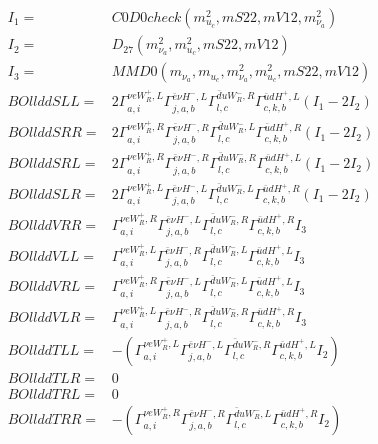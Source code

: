 \documentclass[A4,landscape]{article}
\begin{document}
\begin{align} 
I_1 = & C0D0check(m^2_{u_{{c}}}, mS22, mV12, m^2_{\nu_{{a}}}) \\ 
I_2 = & D_{27}(m^2_{\nu_{{a}}}, m^2_{u_{{c}}}, mS22, mV12) \\ 
I_3 = & MMD0(m_{\nu_{{a}}}, m_{u_{{c}}}, m^2_{\nu_{{a}}}, m^2_{u_{{c}}}, mS22, mV12) \\ 
  BOllddSLL= & 2  \Gamma^{\nu e W_R^+,L}_{a, i} \Gamma^{\bar{e}\nu H^- ,L}_{j, a, b} \Gamma^{\bar{d}u W_R^- ,R}_{l, c} \Gamma^{\bar{u}d H^+,L}_{c, k, b} (I_1 - 2 I_2) \\ 
  BOllddSRR= & 2  \Gamma^{\nu e W_R^+,R}_{a, i} \Gamma^{\bar{e}\nu H^- ,R}_{j, a, b} \Gamma^{\bar{d}u W_R^- ,L}_{l, c} \Gamma^{\bar{u}d H^+,R}_{c, k, b} (I_1 - 2 I_2) \\ 
  BOllddSRL= & 2  \Gamma^{\nu e W_R^+,R}_{a, i} \Gamma^{\bar{e}\nu H^- ,R}_{j, a, b} \Gamma^{\bar{d}u W_R^- ,R}_{l, c} \Gamma^{\bar{u}d H^+,L}_{c, k, b} (I_1 - 2 I_2) \\ 
  BOllddSLR= & 2  \Gamma^{\nu e W_R^+,L}_{a, i} \Gamma^{\bar{e}\nu H^- ,L}_{j, a, b} \Gamma^{\bar{d}u W_R^- ,L}_{l, c} \Gamma^{\bar{u}d H^+,R}_{c, k, b} (I_1 - 2 I_2) \\ 
  BOllddVRR= &  \Gamma^{\nu e W_R^+,R}_{a, i} \Gamma^{\bar{e}\nu H^- ,L}_{j, a, b} \Gamma^{\bar{d}u W_R^- ,R}_{l, c} \Gamma^{\bar{u}d H^+,R}_{c, k, b} I_3 \\ 
  BOllddVLL= &  \Gamma^{\nu e W_R^+,L}_{a, i} \Gamma^{\bar{e}\nu H^- ,R}_{j, a, b} \Gamma^{\bar{d}u W_R^- ,L}_{l, c} \Gamma^{\bar{u}d H^+,L}_{c, k, b} I_3 \\ 
  BOllddVRL= &  \Gamma^{\nu e W_R^+,R}_{a, i} \Gamma^{\bar{e}\nu H^- ,L}_{j, a, b} \Gamma^{\bar{d}u W_R^- ,L}_{l, c} \Gamma^{\bar{u}d H^+,L}_{c, k, b} I_3 \\ 
  BOllddVLR= &  \Gamma^{\nu e W_R^+,L}_{a, i} \Gamma^{\bar{e}\nu H^- ,R}_{j, a, b} \Gamma^{\bar{d}u W_R^- ,R}_{l, c} \Gamma^{\bar{u}d H^+,R}_{c, k, b} I_3 \\ 
  BOllddTLL= & -( \Gamma^{\nu e W_R^+,L}_{a, i} \Gamma^{\bar{e}\nu H^- ,L}_{j, a, b} \Gamma^{\bar{d}u W_R^- ,R}_{l, c} \Gamma^{\bar{u}d H^+,L}_{c, k, b} I_2) \\ 
  BOllddTLR= & 0 \\ 
  BOllddTRL= & 0 \\ 
  BOllddTRR= & -( \Gamma^{\nu e W_R^+,R}_{a, i} \Gamma^{\bar{e}\nu H^- ,R}_{j, a, b} \Gamma^{\bar{d}u W_R^- ,L}_{l, c} \Gamma^{\bar{u}d H^+,R}_{c, k, b} I_2) \\ 
\end{align} 
\end{document}
